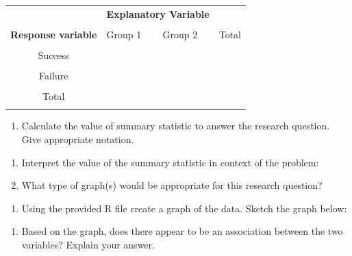 \documentclass[
]{report}
\providecommand{\tightlist}{%
  \setlength{\itemsep}{0pt}\setlength{\parskip}{0pt}}
\begin{document}
\begingroup
\setlength{\tabcolsep}{14pt}
\renewcommand{\arraystretch}{2}
\begin{center}
\begin{tabular}{|c|p{1in}|p{1in}|p{1in}|}
\hline
 & \multicolumn{2}{|c|}{\textbf{Explanatory Variable}} & \\ 
 & \multicolumn{2}{|c|}{ } & \\ \hline
\textbf{Response variable} & Group 1 & Group 2 & Total \\
 & & & \\ \hline
 Success & & & \\
 & & & \\ \hline
 Failure & & & \\
 & & & \\ \hline
 Total & & & \\
 & & & \\ \hline
\end{tabular}
\end{center}
\endgroup

\begin{enumerate}
\def\labelenumi{\alph{enumi}.}
\setcounter{enumi}{3}
\tightlist
\item
  Calculate the value of summary statistic to answer the research question. Give appropriate notation.
\end{enumerate}

\newpage

\begin{enumerate}
\def\labelenumi{\alph{enumi}.}
\setcounter{enumi}{4}
\item
  Interpret the value of the summary statistic in context of the problem:
  \vspace{0.5in}
\item
  What type of graph(s) would be appropriate for this research question?
\end{enumerate}

\vspace{0.2in}

\begin{enumerate}
\def\labelenumi{\alph{enumi}.}
\setcounter{enumi}{6}
\tightlist
\item
  Using the provided R file create a graph of the data. Sketch the graph below:
\end{enumerate}

\vspace{2in}

\begin{enumerate}
\def\labelenumi{\alph{enumi}.}
\setcounter{enumi}{7}
\tightlist
\item
  Based on the graph, does there appear to be an association between the two variables? Explain your answer.
\end{enumerate}
\end{document}
